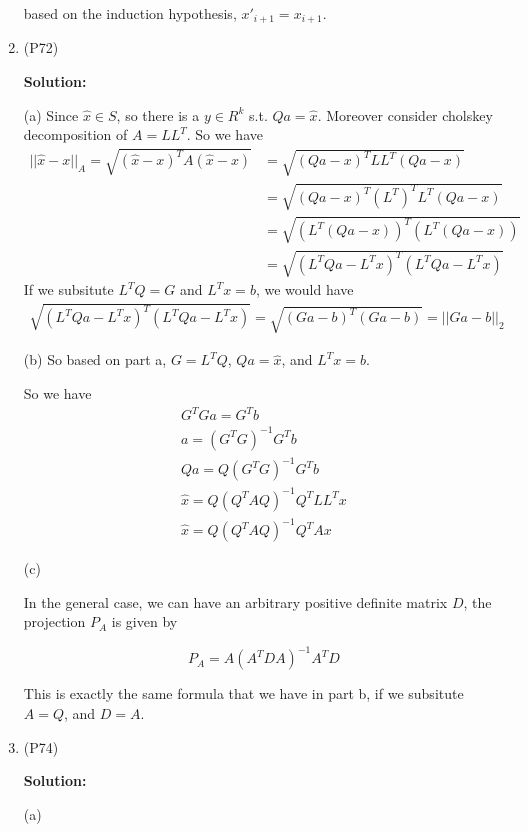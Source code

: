 \documentclass{article}
\begin{document}
\begin{enumerate}[leftmargin=\labelsep]
		based on the induction hypothesis, $x'_{i+1} = x_{i+1}$.
		\item (P72) 
		
		\textbf{Solution:}

		(a) Since $\hat{x} \in S$, so there is a $y \in R^{k}$ s.t. $Qa = \hat{x}$. Moreover consider cholskey decomposition of $A = LL^T$. So we have 
		\begin{align}
			||\hat{x} - x||_A = \sqrt{(\hat{x}-x)^TA(\hat{x}-x)} &=\sqrt{(Qa-x)^TLL^T(Qa-x)} \\&= \sqrt{(Qa-x)^T(L^T)^TL^T(Qa-x)}\\&= \sqrt{(L^T(Qa-x))^T(L^T(Qa-x))}\\&= \sqrt{(L^TQa-L^Tx)^T(L^TQa-L^Tx)}
		\end{align}
		If we subsitute $L^TQ = G$ and $L^Tx = b$, we would have
		\begin{align}
			\sqrt{(L^TQa-L^Tx)^T(L^TQa-L^Tx)} = \sqrt{(Ga-b)^T(Ga-b)} = ||Ga-b||_2
		\end{align}

		(b) So based on part a, $G = L^TQ$, $Qa = \hat{x}$, and $L^Tx = b$.

		So we have 
		\begin{align}
			G^TGa = G^Tb\\
			a = (G^TG)^{-1}G^Tb\\
			Qa = Q(G^TG)^{-1}G^Tb\\
			\hat{x} = Q(Q^TAQ)^{-1}Q^TLL^Tx\\
			\hat{x} = Q(Q^TAQ)^{-1}Q^TAx
		\end{align}

		(c) 
		
		In the general case, we can have an arbitrary positive definite matrix $D$, the projection $P_{A}$ is given by

		$$P_A = A(A^TDA)^{-1}A^TD$$

		This is exactly the same formula that we have in part b, if we subsitute $A = Q$, and $D = A$.

		\item (P74) 
		
		\textbf{Solution:} 

		(a) 


\end{enumerate}
\end{document}
